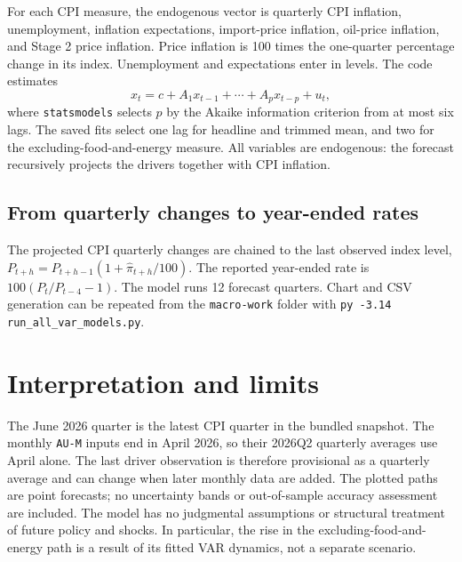 \documentclass[11pt,a4paper]{article}
\begin{document}
For each CPI measure, the endogenous vector is quarterly CPI inflation, unemployment, inflation expectations, import-price inflation, oil-price inflation, and Stage 2 price inflation. Price inflation is 100 times the one-quarter percentage change in its index. Unemployment and expectations enter in levels. The code estimates
\[
  x_t=c+A_1x_{t-1}+\cdots+A_px_{t-p}+u_t,
\]
where \texttt{statsmodels} selects $p$ by the Akaike information criterion from at most six lags. The saved fits select one lag for headline and trimmed mean, and two for the excluding-food-and-energy measure. All variables are endogenous: the forecast recursively projects the drivers together with CPI inflation.

\subsection{From quarterly changes to year-ended rates}
The projected CPI quarterly changes are chained to the last observed index level, $P_{t+h}=P_{t+h-1}(1+\widehat{\pi}_{t+h}/100)$. The reported year-ended rate is $100(P_t/P_{t-4}-1)$. The model runs 12 forecast quarters. Chart and CSV generation can be repeated from the \texttt{macro-work} folder with \texttt{py -3.14 run\_all\_var\_models.py}.

\section{Interpretation and limits}
The June 2026 quarter is the latest CPI quarter in the bundled snapshot. The monthly \texttt{AU-M} inputs end in April 2026, so their 2026Q2 quarterly averages use April alone. The last driver observation is therefore provisional as a quarterly average and can change when later monthly data are added. The plotted paths are point forecasts; no uncertainty bands or out-of-sample accuracy assessment are included. The model has no judgmental assumptions or structural treatment of future policy and shocks. In particular, the rise in the excluding-food-and-energy path is a result of its fitted VAR dynamics, not a separate scenario.
\end{document}
